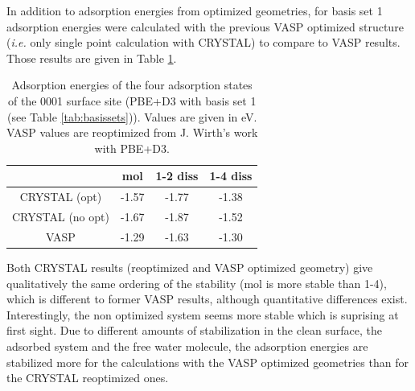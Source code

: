 \documentclass[11pt,DIV=13,BCOR=5mm,a4paper,headinclude]{scrbook}
\begin{document}
In addition to adsorption energies from optimized geometries, for basis set 1 adsorption energies were calculated with the previous VASP optimized structure (\textit{i.e.} only single point calculation with CRYSTAL) to compare to VASP results.
Those results are given in Table \ref{tab:pbe-vasp-geom}.
\begin{table}[!h]
  \centering
   \caption{Adsorption energies of the four adsorption states of the 0001 surface site (PBE+D3 with basis set 1 (see Table \ref{tab:basissets})).
Values are given in eV.
VASP values are reoptimized from J. Wirth's work with PBE+D3.}
  \begin{tabular}{cccc}%
  \toprule
   &mol & 1-2 diss & 1-4 diss\\\midrule %
CRYSTAL (opt) & -1.57 & -1.77 &-1.38 \\%
   CRYSTAL (no opt)&-1.67 &-1.87 &-1.52\\%
  VASP &-1.29 &-1.63 &-1.30 \\%
  \bottomrule
  \end{tabular}
  \label{tab:pbe-vasp-geom}
\end{table}
Both CRYSTAL results (reoptimized and VASP optimized geometry) give qualitatively the same ordering of the stability (mol is more stable than 1-4), which is different to former VASP results, although quantitative differences exist.
Interestingly, the non optimized system seems more stable which is suprising at first sight.
Due to different amounts of stabilization in the clean surface, the adsorbed system and the free water molecule, the adsorption energies are stabilized more for the calculations with the VASP optimized geometries than for the CRYSTAL reoptimized ones.
\\\\
\end{document}
